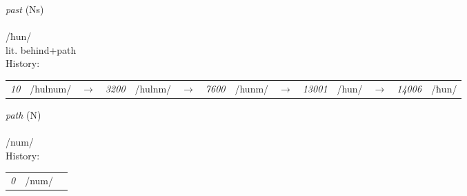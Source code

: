 \vspace{15pt}
\begin{nopagebreak}
 \textit{past} (Ns)\\
\\
\noindent /ħ{\textprimstress}un/\\
\noindent lit. behind+path\\


\noindent History:

\vspace{-0pt}
\hspace{40pt}
\begin{tabular}{ccc}
\textit{10} & /hulnum/&$\rightarrow$ & \textit{3200} & /hulnm/&$\rightarrow$ & \textit{7600} & /hunm/&$\rightarrow$ & \textit{13001} & /hun/&$\rightarrow$ & \textit{14006} & /ħun/& \\
\end{tabular}

\vspace{20pt}\hline

\end{nopagebreak}
\filbreak



\vspace{15pt}
\begin{nopagebreak}
 \textit{path} (N)\\
\\
\noindent /n{\textprimstress}um/\\


\noindent History:

\vspace{-0pt}
\hspace{40pt}
\begin{tabular}{ccc}
\textit{0} & /num/& \\
\end{tabular}

\vspace{20pt}\hline

\end{nopagebreak}
\filbreak



